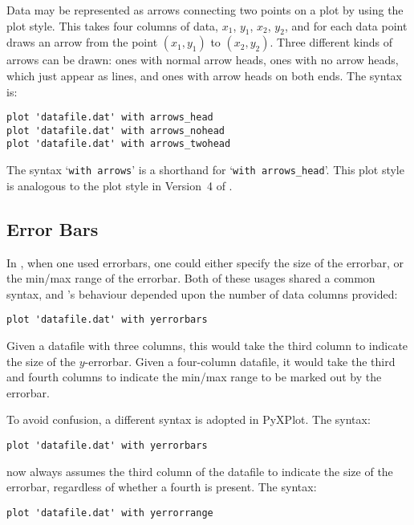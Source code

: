 Data may be represented as arrows connecting two points on a plot by using the
 plot style.  This takes four columns of data, $x_1$, $y_1$,
$x_2$, $y_2$, and for each data point draws an arrow from the point $(x_1,y_1)$
to $(x_2,y_2)$.  Three different kinds of arrows can be drawn: ones with normal
arrow heads, ones with no arrow heads, which just appear as lines, and ones
with arrow heads on both ends. The syntax is:

\begin{verbatim}
plot 'datafile.dat' with arrows_head
plot 'datafile.dat' with arrows_nohead
plot 'datafile.dat' with arrows_twohead
\end{verbatim}

The syntax `{\tt with arrows}' is a shorthand for `{\tt with arrows\_head}'.
This plot style is analogous to the  plot style in Version~4 of
\gnuplot.

\subsection{Error Bars}

\label{errorbars}
In \gnuplot, when one used errorbars, one could either specify the size of the
errorbar, or the min/max range of the errorbar. Both of these usages shared a
common syntax, and \gnuplot's behaviour depended upon the number of data columns
provided:

\begin{verbatim}
plot 'datafile.dat' with yerrorbars
\end{verbatim}

\noindent Given a datafile with three columns, this would take the third column
to indicate the size of the $y$-errorbar. Given a four-column datafile, it
would take the third and fourth columns to indicate the min/max range to be
marked out by the errorbar.

To avoid confusion, a different syntax is adopted in PyXPlot. The syntax:

\begin{verbatim}
plot 'datafile.dat' with yerrorbars
\end{verbatim}

\noindent now always assumes the third column of the datafile to indicate the
size of the errorbar, regardless of whether a fourth is present. The syntax:

\begin{verbatim}
plot 'datafile.dat' with yerrorrange
\end{verbatim}

